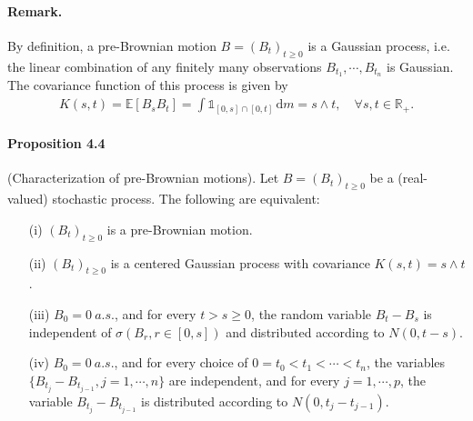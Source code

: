 \documentclass{article}
\numberwithin{equation}{section}
\newcommand{\E}{\mathbb{E}}
\renewcommand{\d}{\mathrm{d}}
\theoremstyle{plain}
\theoremstyle{definition}
\begin{document}
\paragraph{Remark.} By definition, a pre-Brownian motion $B=(B_t)_{t\geq 0}$ is a Gaussian process, i.e. the linear combination of any finitely many observations $B_{t_1},\cdots,B_{t_n}$ is Gaussian. The covariance function of this process is given by
\begin{align*}
	K(s,t) = \E\left[B_sB_t\right] = \int\mathds{1}_{[0,s]\cap[0,t]}\,\d m = s\wedge t,\quad \forall s,t\in\mathbb{R}_+.
\end{align*}

\paragraph{Proposition 4.4\label{prop:4.4}} (Characterization of pre-Brownian motions). Let $B=(B_t)_{t\geq 0}$ be a (real-valued) stochastic process. The following are equivalent:
\begin{itemize}
\item[(i)] $(B_t)_{t\geq 0}$ is a pre-Brownian motion.
\item[(ii)] $(B_t)_{t\geq 0}$ is a centered Gaussian process with covariance $K(s,t)=s\wedge t$.
\item[(iii)] $B_0=0\ a.s.$, and for every $t>s\geq 0$, the random variable $B_t-B_s$ is independent of $\sigma(B_r,r\in[0,s])$ and distributed according to $N(0,t-s)$.
\item[(iv)] $B_0=0\ a.s.$, and for every choice of $0=t_0<t_1<\cdots<t_n$, the variables $\{B_{t_j}-B_{t_{j-1}},j=1,\cdots,n\}$ are independent, and for every $j=1,\cdots,p$, the variable $B_{t_j}-B_{t_{j-1}}$ is distributed according to $N(0,t_j-t_{j-1})$.
\end{itemize}
\end{document}
